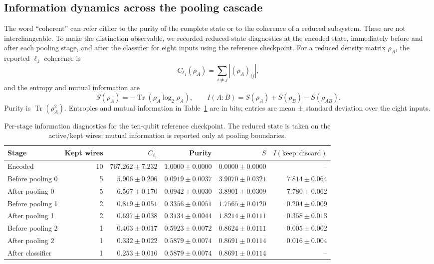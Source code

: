 \documentclass[conference]{IEEEtran}
\begin{document}
\subsection{Information dynamics across the pooling cascade}
\label{sec:infodyn}
The word ``coherent'' can refer either to the purity of the complete state or to
the coherence of a reduced subsystem. These are not interchangeable. To make
the distinction observable, we recorded reduced-state diagnostics at the
encoded state, immediately before and after each pooling stage, and after the
classifier for eight inputs using the reference checkpoint. For a reduced density matrix
$\rho_A$, the reported $\ell_1$ coherence is
\begin{equation}
C_{\ell_1}(\rho_A)=\sum_{i\ne j}|(\rho_A)_{ij}|,
\end{equation}
and the entropy and mutual information are
{\scriptsize
\begin{equation}
S(\rho_A)=-\operatorname{Tr}(\rho_A\log_2\rho_A),\qquad
I(A:B)=S(\rho_A)+S(\rho_B)-S(\rho_{AB}).
\end{equation}
}
Purity is $\operatorname{Tr}(\rho_A^2)$. Entropies and mutual information in
Table~\ref{tab:information} are in bits; entries are mean $\pm$ standard
deviation over the eight inputs.

\begin{table}[!t]
\caption{Per-stage information diagnostics for the ten-qubit reference checkpoint. The reduced state is taken on the active/kept wires; mutual information is reported only at pooling boundaries. }
\label{tab:information}
\centering
\small
\begin{tabular}{@{}lrrrrr@{}}
\toprule
\textbf{Stage} & \textbf{Kept wires} & \textbf{$C_{\ell_1}$} & \textbf{Purity} & \textbf{$S$} & \textbf{$I(\mathrm{keep}:\mathrm{discard})$} \\
\midrule
Encoded & 10 & $767.262\pm7.232$ & $1.0000\pm0.0000$ & $0.0000\pm0.0000$ & -- \\
Before pooling 0 & 5 & $5.906\pm0.206$ & $0.0919\pm0.0037$ & $3.9070\pm0.0321$ & $7.814\pm0.064$ \\
After pooling 0 & 5 & $6.567\pm0.170$ & $0.0942\pm0.0030$ & $3.8901\pm0.0309$ & $7.780\pm0.062$ \\
Before pooling 1 & 2 & $0.819\pm0.051$ & $0.3356\pm0.0051$ & $1.7565\pm0.0120$ & $0.204\pm0.009$ \\
After pooling 1 & 2 & $0.697\pm0.038$ & $0.3134\pm0.0044$ & $1.8214\pm0.0111$ & $0.358\pm0.013$ \\
Before pooling 2 & 1 & $0.403\pm0.017$ & $0.5923\pm0.0072$ & $0.8624\pm0.0111$ & $0.005\pm0.002$ \\
After pooling 2 & 1 & $0.332\pm0.022$ & $0.5879\pm0.0074$ & $0.8691\pm0.0114$ & $0.016\pm0.004$ \\
After classifier & 1 & $0.253\pm0.016$ & $0.5879\pm0.0074$ & $0.8691\pm0.0114$ & -- \\
\bottomrule
\end{tabular}
\end{table}
\end{document}
